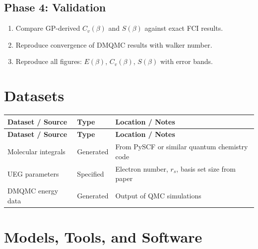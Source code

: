 \documentclass[11pt,a4paper]{article}
\begin{document}
\subsection{Phase 4: Validation}
\begin{enumerate}[label=\textbf{4.\arabic*}]
  \item Compare GP-derived $C_v(\beta)$ and $S(\beta)$ against exact FCI results.
  \item Reproduce convergence of DMQMC results with walker number.
  \item Reproduce all figures: $E(\beta)$, $C_v(\beta)$, $S(\beta)$ with error bands.
\end{enumerate}

\section{Datasets}

\begin{longtable}{p{4.5cm} p{3.5cm} p{6cm}}
\toprule
\textbf{Dataset / Source} & \textbf{Type} & \textbf{Location / Notes} \\
\midrule
\endfirsthead
\toprule
\textbf{Dataset / Source} & \textbf{Type} & \textbf{Location / Notes} \\
\midrule
\endhead
Molecular integrals & Generated & From PySCF or similar quantum chemistry code \\
\midrule
UEG parameters & Specified & Electron number, $r_s$, basis set size from paper \\
\midrule
DMQMC energy data & Generated & Output of QMC simulations \\
\bottomrule
\end{longtable}

\section{Models, Tools, and Software}
\end{document}
